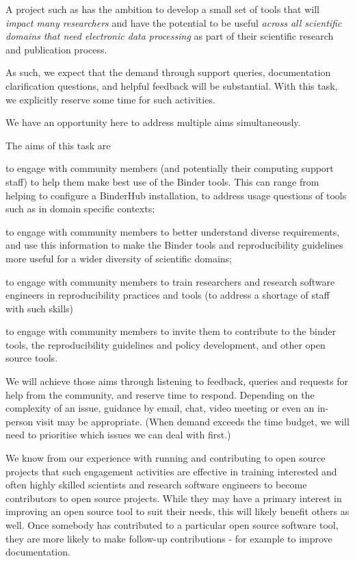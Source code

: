 \begin{task}[
  title=Community support and engagement,
  id=community-support,
  lead=SRL,
  PM=13,
  wphases={0-36!.36},
  partners={SRL,MP,UIO,IFR}
]
A project such as \TheProject{} has the ambition to develop a small set of tools
that will \emph{impact many researchers} and have the potential to be useful 
\emph{across all scientific domains that need electronic data processing} as part of their
scientific research and publication process.

As such, we expect that the demand through support queries, documentation
clarification questions, and helpful feedback will be substantial. With this
task, we explicitly reserve some time for such activities.

We have an opportunity here to address multiple aims simultaneously.

The aims of this task are
\begin{compactitem}
\item to engage with community members (and potentially their computing support
  staff) to help them make best use of the Binder tools. This can range from
  helping to configure a BinderHub installation, to address usage questions of
  tools such as \repotodocker{} in domain specific contexts;
\item to engage with community members to better understand diverse
  requirements, and use this information to make the Binder tools and
  reproducibility guidelines more useful for a wider diversity of scientific
  domains;
\item to engage with community members to train researchers and research
  software engineers in reproducibility practices and tools (to address a
  shortage of staff with such skills)
\item to engage with community members to invite them to contribute to the
  binder tools, the reproducibility guidelines and policy development, and other
  open source tools.
\end{compactitem}

We will achieve those aims through listening to feedback, queries and requests
for help from the community, and reserve time to respond. Depending on the
complexity of an issue, guidance by email, chat, video meeting or even an
in-person visit may be appropriate. (When demand exceeds the time budget, we
will need to prioritise which issues we can deal with first.)

We know from our experience with running and contributing to open source
projects that such engagement activities are effective in training interested
and often highly skilled scientists and research software engineers to become
contributors to open source projects. While they may have a primary interest in
improving an open source tool to suit their needs, this will likely benefit
others as well. Once somebody has contributed to a particular open source
software tool, they are more likely to make follow-up contributions - for
example to improve documentation.

\end{task}
